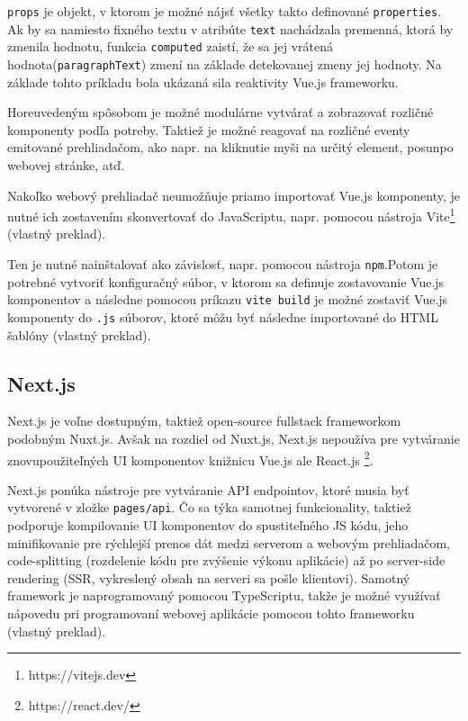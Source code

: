 \texttt{props} je objekt, v ktorom je možné nájsť všetky takto definované \texttt{properties}. Ak by sa namiesto fixného textu v atribúte \texttt{text} nachádzala premenná, ktorá by zmenila hodnotu, funkcia \texttt{computed} zaistí, že sa jej vrátená hodnota\newline (\texttt{paragraphText}) zmení na základe detekovanej zmeny jej hodnoty.
Na základe tohto príkladu bola ukázaná sila reaktivity Vue.js frameworku.

\clearpage

Horeuvedeným spôsobom je možné modulárne vytvárať a zobrazovať rozličné komponenty podľa potreby. Taktiež je možné reagovať na rozličné eventy emitované prehliadačom, ako napr. na kliknutie myši na určitý element, posun\newline po webovej stránke, atď.

Nakoľko webový prehliadač neumožňuje priamo importovať Vue.js komponenty, je nutné ich zostavením skonvertovať do JavaScriptu, napr. pomocou nástroja Vite\footnote{https://vitejs.dev} \cite{vuejs_introduction} (vlastný preklad).

Ten je nutné nainštalovať ako závislosť, napr. pomocou nástroja \texttt{npm}.\newline Potom je potrebné vytvoriť konfiguračný súbor, v ktorom sa definuje zostavovanie Vue.js komponentov a následne pomocou príkazu \texttt{vite build} je možné zostaviť Vue.js komponenty do \texttt{.js} súborov, ktoré môžu byť následne importované do HTML šablóny \cite{vuejs_introduction} (vlastný preklad).

\subsection {Next.js}
Next.js je voľne dostupným, taktiež open-source fullstack frameworkom podobným Nuxt.js. Avšak na rozdiel od Nuxt.js, Next.js nepoužíva pre vytváranie znovupoužiteľných UI komponentov knižnicu Vue.js ale React.js \footnote{https://react.dev/}.

Next.js ponúka nástroje pre vytváranie API endpointov, ktoré musia byť vytvorené v zložke \texttt{pages/api}. Čo sa týka samotnej funkcionality, taktiež podporuje kompilovanie UI komponentov do spustiteľného JS kódu, jeho minifikovanie pre rýchlejší prenos dát medzi serverom a webovým prehliadačom, code-splitting (rozdelenie kódu pre zvýšenie výkonu aplikácie) až po server-side rendering (SSR, vykreslený obsah na serveri sa pošle klientovi). Samotný framework je naprogramovaný pomocou TypeScriptu, takže je možné využívať nápovedu pri programovaní webovej aplikácie pomocou tohto frameworku \cite{nextjs_introduction} (vlastný preklad).

